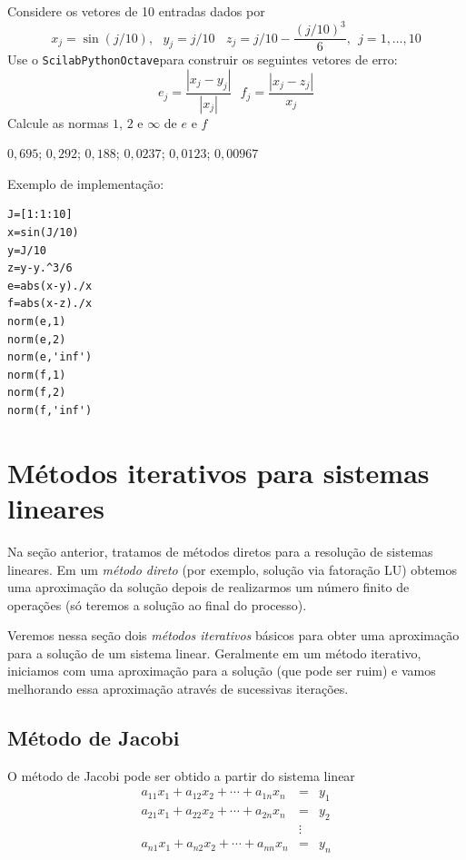 \begin{exer} Considere os vetores de 10 entradas dados por $$x_j=\sin(j/10),~~~y_j=j/10~~~~z_j=j/10-\frac{\left(j/10\right)^3}{6},~~ j=1,\ldots,10$$
Use o \ifisscilab\verb+Scilab+\fi\ifispython\verb+Python+\fi\ifisoctave\verb+Octave+\fi para construir os seguintes vetores de erro:
$$e_{j}=\frac{|x_j-y_j|}{|x_j|}~~~ f_j=\frac{|x_j-z_j|}{x_j}$$
Calcule as normas $1$, $2$ e $\infty$ de $e$ e $f$
\end{exer}
\begin{resp}
$0,695$; $0,292$; $0,188$;  $0,0237$; $0,0123$; $0,00967$

\ifisscilab
Exemplo de implementação:
\begin{verbatim}
J=[1:1:10]
x=sin(J/10)
y=J/10
z=y-y.^3/6
e=abs(x-y)./x
f=abs(x-z)./x
norm(e,1)
norm(e,2)
norm(e,'inf')
norm(f,1)
norm(f,2)
norm(f,'inf')
\end{verbatim}
\fi
\end{resp}



\section{Métodos iterativos para sistemas lineares}
Na seção anterior, tratamos de métodos diretos para a resolução de sistemas lineares. Em um \emph{método direto} (por exemplo, solução via fatoração LU) obtemos uma aproximação da solução depois de realizarmos um número finito de operações (só teremos a solução ao final do processo).

Veremos nessa seção dois \emph{métodos iterativos} básicos para obter uma aproximação para a solução de um sistema linear. Geralmente em um método iterativo, iniciamos com uma aproximação para a solução (que pode ser ruim) e vamos melhorando essa aproximação através de sucessivas iterações.

\subsection{Método de Jacobi}
O método de Jacobi pode ser obtido a partir do sistema linear
\begin{eqnarray*}
a_{11}x_1+a_{12}x_2+\cdots+a_{1n}x_n&=&y_1\\
a_{21}x_1+a_{22}x_2+\cdots+a_{2n}x_n&=&y_2\\
&\vdots&     \\
a_{n1}x_1+a_{n2}x_2+\cdots+a_{nn}x_n&=& y_n
\end{eqnarray*}

